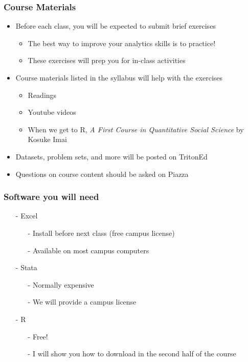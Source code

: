 \documentclass[11pt]{beamer}
\begin{document}
\begin{frame}
\frametitle{Course Materials}
\begin{itemize}
\item Before each class, you will be expected to submit brief exercises
\begin{itemize}
	\item The best way to improve your analytics skills is to \alert{practice}!
	\item These exercises will prep you for in-class activities \pause
\end{itemize}
\item Course materials listed in the syllabus will help with the exercises
\begin{itemize}
\item Readings
\item Youtube videos
\item When we get to R, \textit{A First Course in Quantitative Social Science} by Kosuke Imai \pause
\end{itemize}
\item Datasets, problem sets, and more will be posted on \alert{TritonEd} \pause
\item Questions on course content should be asked on \alert{Piazza}
\end{itemize}
\end{frame}

\begin{frame}
\frametitle{Software you will need}
\begin{itemize}
\item[-] \alert{Excel}
\begin{itemize}
\item[-] Install before next class (free campus license)
\item[-] Available on most campus computers
\end{itemize}
\item[-] \alert{Stata}
\begin{itemize}
\item[-] Normally expensive
\item[-] We will provide a campus license
\end{itemize}
\item[-] \alert{R}
\begin{itemize}
\item[-] Free!  
\item[-] I will show you how to download in the second half of the course
\end{itemize}
\end{itemize}
\end{frame}
\end{document}

